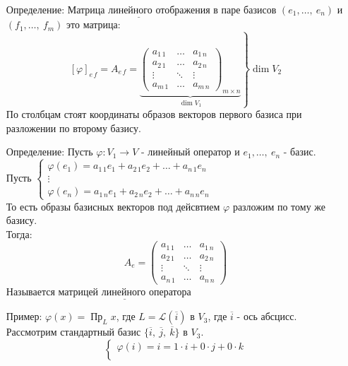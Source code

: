 \documentclass[12pt, letterpaper, twoside]{article}
\newcommand{\Underl}[1]{$\underline{\text{#1}}$}
\begin{document}
    \begin{enumerate}
        \item[Определение:] \Underl{Матрица линейного отображения} в паре базисов $(e_1,\dots,\ e_n)$ и $(f_1,\dots,\ f_m)$ это матрица:
        \[[\varphi]_{e\, f} = A_{e\, f} = \left.\underset{\dim V_1}{\underbrace{\begin{pmatrix}
            a_{1\, 1} & \dots & a_{1\, n}\\
            a_{2\, 1} & \dots & a_{2\, n}\\
            \vdots & \ddots & \vdots\\
            a_{m\, 1} & \dots & a_{m\, n}
        \end{pmatrix}_{m\times n}}}\right\} \dim V_2\]
        По столбцам стоят координаты образов векторов первого базиса при разложении по второму базису.
        \item[Определение:] Пусть $\varphi: V_1\longrightarrow V$ - линейный оператор и $e_1,\dots,\ e_n$ - базис.\\
        Пусть $\begin{cases}
            \varphi(e_1) = a_{1\, 1}e_1 + a_{2\, 1}e_2 + \dots + a_{n\, 1} e_n\\
            \vdots\\
            \varphi(e_n) = a_{1\, n} e_1 + a_{2\, n} e_2 + \dots + a_{n\, n} e_n 
        \end{cases}$\\
        То есть образы базисных векторов под дейсвтием $\varphi$ разложим по тому же базису.\\
        Тогда:
        \[A_e = \begin{pmatrix}
            a_{1\, 1} & \dots & a_{1\, n}\\
            a_{2\, 1} & \dots & a_{2\, n}\\
            \vdots & \ddots & \vdots\\
            a_{n\, 1} & \dots & a_{n\, n}
        \end{pmatrix}\]
        Называется \Underl{матрицей линейного оператора}
        \item[Пример:] $\varphi(x) = \operatorname{\text{Пр}}_L x$, где $L = \mathcal{L}(\overline{i})$ в $V_3$, где $\overline{i}$ - ось абсцисс.\\
        Рассмотрим стандартный базис $\{\overline{i},\ \overline{j},\ \overline{k}\}$ в $V_3$.
        \[\begin{cases}
            \varphi(i) = i = 1\cdot i + 0\cdot j + 0\cdot k\\

\end{cases}\]
\end{enumerate}
\end{document}

